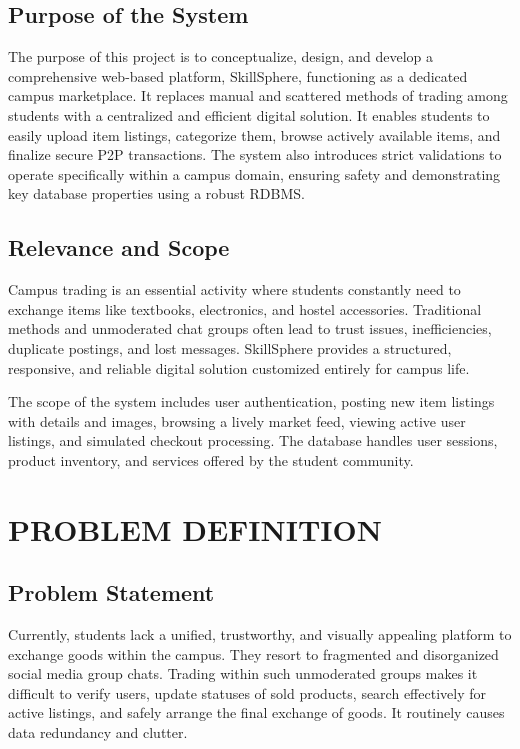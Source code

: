 \documentclass[a4paper,12pt]{report}
\begin{document}
\section{Purpose of the System}

The purpose of this project is to conceptualize, design, and develop a comprehensive web-based platform, SkillSphere, functioning as a dedicated campus marketplace. It replaces manual and scattered methods of trading among students with a centralized and efficient digital solution. It enables students to easily upload item listings, categorize them, browse actively available items, and finalize secure P2P transactions. The system also introduces strict validations to operate specifically within a campus domain, ensuring safety and demonstrating key database properties using a robust RDBMS.

\section{Relevance and Scope}

Campus trading is an essential activity where students constantly need to exchange items like textbooks, electronics, and hostel accessories. Traditional methods and unmoderated chat groups often lead to trust issues, inefficiencies, duplicate postings, and lost messages. SkillSphere provides a structured, responsive, and reliable digital solution customized entirely for campus life.

The scope of the system includes user authentication, posting new item listings with details and images, browsing a lively market feed, viewing active user listings, and simulated checkout processing. The database handles user sessions, product inventory, and services offered by the student community.

\chapter{PROBLEM DEFINITION}

\section{Problem Statement}

Currently, students lack a unified, trustworthy, and visually appealing platform to exchange goods within the campus. They resort to fragmented and disorganized social media group chats. Trading within such unmoderated groups makes it difficult to verify users, update statuses of sold products, search effectively for active listings, and safely arrange the final exchange of goods. It routinely causes data redundancy and clutter.
\end{document}
